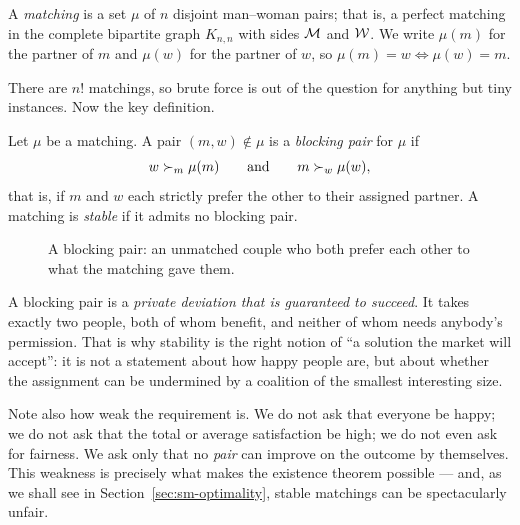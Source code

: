 \begin{definition}[Matching]
A \emph{matching} is a set $\mu$ of $n$ disjoint man--woman pairs; that is, a
perfect matching in the complete bipartite graph $K_{n,n}$ with sides $\mathcal{M}$
and $\mathcal{W}$. We write $\mu(m)$ for the partner of $m$ and $\mu(w)$ for the
partner of $w$, so $\mu(m) = w \iff \mu(w) = m$.
\end{definition}

There are $n!$ matchings, so brute force is out of the question for anything
but tiny instances. Now the key definition.

\begin{definition}\label{def:sm-stable}
Let $\mu$ be a matching. A pair $(m,w) \notin \mu$ is a \emph{blocking pair}
for $\mu$ if
\[
  w \succ_{m} \mu(m)
  \qquad\text{and}\qquad
  m \succ_{w} \mu(w),
\]
that is, if $m$ and $w$ each strictly prefer the other to their assigned
partner. A matching is \emph{stable} if it admits no blocking pair.
\end{definition}

\begin{figure}[ht]
\centering
{}
\caption{A blocking pair: an unmatched couple who both prefer each other to
what the matching gave them.}
\label{fig:sm-blockingpair}
\end{figure}

\begin{intuition}
A blocking pair is a \emph{private deviation that is guaranteed to succeed}.
It takes exactly two people, both of whom benefit, and neither of whom needs
anybody's permission. That is why stability is the right notion of ``a
solution the market will accept'': it is not a statement about how happy people
are, but about whether the assignment can be undermined by a coalition of the
smallest interesting size.

Note also how weak the requirement is. We do not ask that everyone be happy;
we do not ask that the total or average satisfaction be high; we do not even
ask for fairness. We ask only that no \emph{pair} can improve on the outcome
by themselves. This weakness is precisely what makes the existence theorem
possible --- and, as we shall see in Section~\ref{sec:sm-optimality}, stable
matchings can be spectacularly unfair.
\end{intuition}

